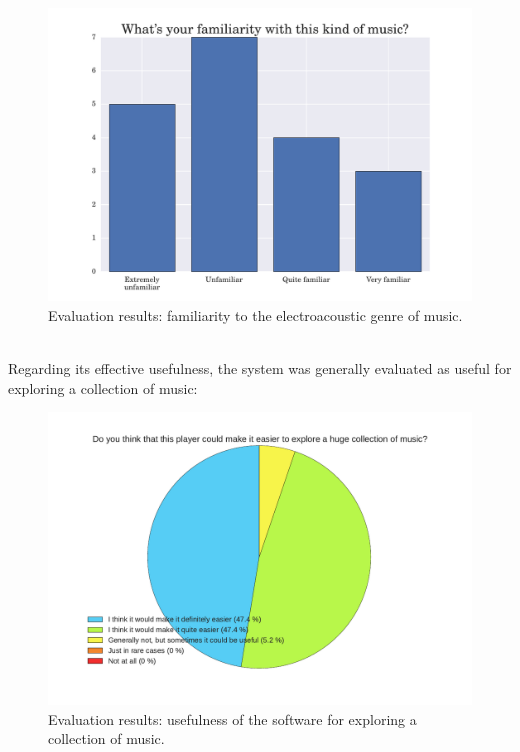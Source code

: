 \begin{figure}[h]
\begin{center}
\includegraphics[scale=0.6]{Figures/musicfamiliarity.pdf}
  \caption[Evaluation results: familiarity to the electroacoustic genre of music]{Evaluation results: familiarity to the electroacoustic genre of music.}
\end{center}
\end{figure}
\\

Regarding its effective usefulness, the system was generally evaluated as useful for exploring a collection of music: \\
\begin{figure}[h]
\vspace{-0.8cm}
\begin{center}
\includegraphics[scale=0.68]{Figures/usage.pdf}
  \caption[Evaluation results: usefulness of the software for exploring a collection of music]{Evaluation results: usefulness of the software for exploring a collection of music.}
\end{center}
\end{figure}
\\

